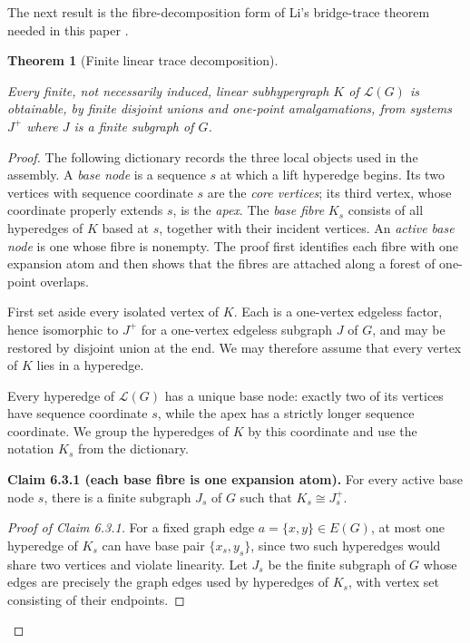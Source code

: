 \documentclass[a4paper,11pt,reqno]{amsart}
\theoremstyle{plain}
\newtheorem{theorem}{Theorem}[section]
\theoremstyle{definition}
\theoremstyle{remark}
\begin{document}
The next result is the fibre-decomposition form of Li's bridge-trace theorem
needed in this paper \citep[Theorem~4.6]{li2026}.

\begin{theorem}[Finite linear trace decomposition]\label{theorem-6.3-exact-finite-linear-trace-theorem}

Every finite, not necessarily induced, linear subhypergraph \(K\) of
\(\mathcal L(G)\) is obtainable, by finite disjoint unions and one-point
amalgamations, from systems \(J^+\) where \(J\) is a finite subgraph of
\(G\).

\end{theorem}
\begin{proof}
The following dictionary records the three local objects used
in the assembly. A \emph{base node} is a sequence \(s\) at which a lift
hyperedge begins. Its two vertices with sequence coordinate \(s\) are the
\emph{core vertices}; its third vertex, whose coordinate properly extends
\(s\), is the \emph{apex}. The \emph{base fibre} \(K_s\) consists of all
hyperedges of \(K\) based at \(s\), together with their incident vertices.
An \emph{active base node} is one whose fibre is nonempty. The proof first
identifies each fibre with one expansion atom and then shows that the fibres
are attached along a forest of one-point overlaps.

First set aside every isolated vertex of \(K\). Each is a one-vertex edgeless
factor, hence isomorphic to \(J^+\) for a one-vertex edgeless subgraph \(J\)
of \(G\), and may be restored by disjoint union at the end. We may therefore
assume that every vertex of \(K\) lies in a hyperedge.

Every hyperedge of \(\mathcal L(G)\) has a unique base node: exactly two of
its vertices have sequence coordinate \(s\), while the apex has a strictly
longer sequence coordinate. We group the hyperedges of \(K\) by this
coordinate and use the notation \(K_s\) from the dictionary.

\medskip
\noindent\textbf{Claim 6.3.1 (each base fibre is one expansion atom).}
For every active base node \(s\), there is a finite subgraph \(J_s\) of
\(G\) such that \(K_s\cong J_s^+\).

\smallskip
\begin{proof}[Proof of Claim 6.3.1]

For a fixed graph edge \(a=\{x,y\}\in E(G)\), at most one hyperedge of \(K_s\) can have base pair \(\{x_s,y_s\}\), since two such hyperedges would share two vertices and violate linearity. Let \(J_s\) be the finite subgraph of \(G\) whose edges are precisely the graph edges used by hyperedges of \(K_s\), with vertex set consisting of their endpoints.


\end{proof}
\end{proof}
\end{document}
